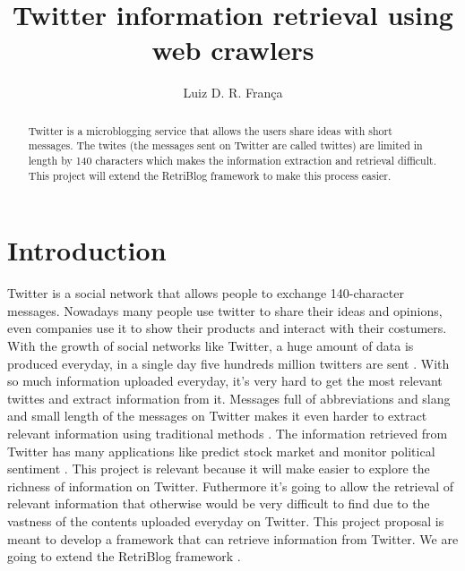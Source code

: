 \documentclass[12pt]{article}
\title{Twitter information retrieval using web crawlers}
\author{Luiz D. R. Fran\c{c}a\inst{1}}
\begin{document}
 

\maketitle

\begin{abstract} 
Twitter is a microblogging service that allows the users share ideas with short messages. The twites (the messages sent on Twitter are called twittes) are limited in length by 140 characters which makes the information extraction and retrieval difficult. This project will extend the RetriBlog framework \cite{Ferreira:13} to make this process easier. 
\end{abstract}

\section{Introduction}
Twitter is a social network that allows people to exchange 140-character messages. Nowadays many people use twitter to share their ideas and opinions, even companies use it to show their products and interact with their costumers. With the growth of social networks like Twitter, a huge amount of data is produced everyday, in a single day five hundreds million twitters are sent \cite{NetLiveStats}.  With so much information uploaded everyday, it's very hard to get the most relevant twittes and extract information from it. Messages full of abbreviations and slang and small length of the messages on Twitter makes it even harder to extract relevant information using traditional methods \cite{Sriram:10}.
\linebreak 
The information retrieved from Twitter has many applications like predict stock market \cite{Bollen:11} and monitor political sentiment \cite{Bermingham:11}. This project is relevant because it will make easier to explore the richness of information on Twitter. Futhermore it's going to allow the retrieval of relevant information that otherwise would be very difficult to find due to the vastness of the contents uploaded everyday on Twitter. 
\linebreak
This project proposal is meant to develop a framework that can retrieve information from Twitter. We are going to extend the RetriBlog framework \cite{Ferreira:13}.
\end{document}
